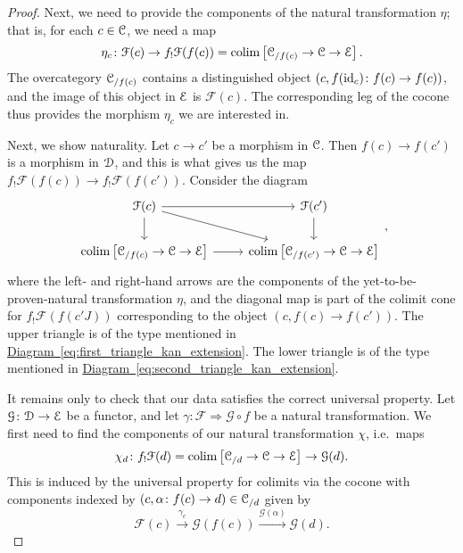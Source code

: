 \documentclass[main.tex]{subfiles}
\begin{document}
\begin{proof}
  Next, we need to provide the components of the natural transformation $\eta$; that is, for each $c \in \mathcal{C}$, we need a map
  \begin{equation*}
    \eta_{c}\colon \mathcal{F}(c) \to f_{!}\mathcal{F}(f(c)) = \operatorname*{colim} \left[ \mathcal{C}_{/f(c)} \to \mathcal{C} \to \mathcal{E} \right].
  \end{equation*}
  The overcategory $\mathcal{C}_{/f(c)}$ contains a distinguished object $(c, f(\mathrm{id}_{c})\colon f(c) \to f(c))$, and the image of this object in $\mathcal{E}$ is $\mathcal{F}(c)$. The corresponding leg of the cocone thus provides the morphism $\eta_{c}$ we are interested in.

  Next, we show naturality. Let $c \to c'$ be a morphism in $\mathcal{C}$. Then $f(c) \to f(c')$ is a morphism in $\mathcal{D}$, and this is what gives us the map $f_{!}\mathcal{F}(f(c)) \to f_{!}\mathcal{F}(f(c'))$. Consider the diagram
  \begin{equation*}
    \begin{tikzcd}
      \mathcal{F}(c)
      \arrow[r]
      \arrow[d]
      \arrow[dr]
      & \mathcal{F}(c')
      \arrow[d]
      \\
      \colim\left[ \category{C}_{/f(c)} \to \category{C} \to \category{E} \right]
      \arrow[r]
      & \colim\left[ \category{C}_{/f(c')} \to \category{C} \to \category{E} \right]
    \end{tikzcd},
  \end{equation*}
  where the left- and right-hand arrows are the components of the yet-to-be-proven-natural transformation $\eta$, and the diagonal map is part of the colimit cone for $f_{!}\mathcal{F}(f(c'J))$ corresponding to the object $(c, f(c) \to f(c'))$. The upper triangle is of the type mentioned in \hyperref[eq:first_triangle_kan_extension]{Diagram~\ref*{eq:first_triangle_kan_extension}}. The lower triangle is of the type mentioned in \hyperref[eq:second_triangle_kan_extension]{Diagram~\ref*{eq:second_triangle_kan_extension}}.

  It remains only to check that our data satisfies the correct universal property. Let $\mathcal{G}\colon \mathcal{D} \to \mathcal{E}$ be a functor, and let $\gamma\colon \mathcal{F} \Rightarrow \mathcal{G} \circ f$ be a natural transformation. We first need to find the components of our natural transformation $\chi$, i.e.\ maps
  \begin{equation*}
    \chi_{d}\colon f_{!}\mathcal{F}(d) = \operatorname*{colim} \left[ \mathcal{C}_{/d} \to \mathcal{C} \to \mathcal{E} \right] \to \mathcal{G}(d).
  \end{equation*}
  This is induced by the universal property for colimits via the cocone with components indexed by $(c, \alpha\colon f(c) \to d) \in \mathcal{C}_{/d}$ given by
  \begin{equation*}
    \mathcal{F}(c) \overset{\gamma_{c}}{\to} \mathcal{G}(f(c)) \overset{\mathcal{G}(\alpha)}{\to} \mathcal{G}(d).
  \end{equation*}


\end{proof}
\end{document}
